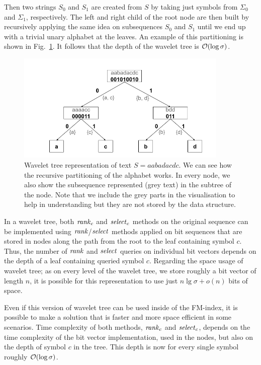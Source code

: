 Then two strings $S_0$ and $S_1$ are created from $S$ by taking just symbols
from $\Sigma_0$ and $\Sigma_1$, respectively. The left and right child of the root node
are then built by recursively applying the same idea on subsequences $S_0$ and $S_1$ until
we end up with a trivial unary alphabet at the leaves. An example of this partitioning is
shown in Fig.~\ref{obr:WaveletTreeExample}. It follows that the depth of the wavelet tree
is $\mathcal{O}(\log \sigma)$.
\begin{figure}
	\centerline{
		\includegraphics[width=0.9\textwidth, height=0.3\textheight]{images/wavelet_tree}
	}
	\caption[TODO]{Wavelet tree representation of text $S=\mathit{aabadacdc}$. We can see how
	the recursive partitioning of the alphabet works. In every node, we also show the
	subsequence represented (grey text) in the subtree of the node. Note that we include the
	grey parts in the visualisation to help in understanding but they are not stored by
	the data structure.
	}
	\label{obr:WaveletTreeExample}
\end{figure}

In a wavelet tree, both $\mathit{rank}_c$ and $\mathit{select}_c$ methods on the original sequence can
be implemented using $\mathit{rank}$/$\mathit{select}$ methods applied on bit sequences that are stored
in nodes along the path from the root to the leaf containing symbol $c$. Thus, the
number of $\mathit{rank}$ and $\mathit{select}$ queries on individual bit vectors depends on the depth of
a leaf containing queried symbol $c$. Regarding the space usage of wavelet tree; as on every
level of the wavelet tree, we store roughly a bit vector of length $n$, it is possible
for this representation to use just $n\lg \sigma+o(n)$ bits of space.

Even if this version of wavelet tree can be used inside of the FM-index, it is possible to
make a solution that is faster and more space efficient in some scenarios. Time complexity
of both methods, $\mathit{rank}_c$ and $\mathit{select}_c$, depends on the time complexity of the bit vector
implementation, used in the nodes, but also on the depth of symbol $c$ in the tree. This depth
is now for every single symbol roughly $\mathcal{O}(\log \sigma)$.

